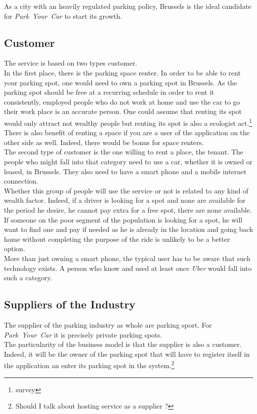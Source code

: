 \documentclass[12pt,a4paper,oneside]{book}
\newcommand{\bp}{\textit{Park~Your~Car }}
\begin{document}
As a city with an heavily regulated parking policy, Brussels is the ideal candidate for \bp to start its growth.

\subsection{Customer}
The service is based on two types customer.\\

In the first place, there is the parking space renter. In order to be able to rent your parking spot, one would need to own a parking spot in Brussels. As the parking spot should be free at a recurring schedule in order to rent it consistently, employed people who do not work at home and use the car to go their work place is an accurate person. One could assume that renting its spot would only attract not wealthy people but renting its spot is also a ecologist act.\footnote{survey} There is also benefit of renting a space if you are a user of the application on the other side as well. Indeed, there would be bonus for space renters.\\

The second type of customer is the one willing to rent a place, the tenant. The people who might fall into that category need to use a car, whether it is owned or leased, in Brussels. They also need to have a smart phone and a mobile internet connection.\\
Whether this group of people will use the service or not is related to any kind of wealth factor. Indeed, if a driver is looking for a spot and none are available for the period he desire, he cannot pay extra for a free spot, there are none available. If someone on the poor segment of the population is looking for a spot, he will want to find one and pay if needed as he is already in the location and going back home without completing the purpose of the ride is unlikely to be a better option.\\
More than just owning a smart phone, the typical user has to be aware that such technology exists. A person who know and used at least once \textit{Uber} would fall into such a category.

\subsection{Suppliers of the Industry}
The supplier of the parking industry as whole are parking sport. For \bp it is precisely private parking spots.\\
The particularity of the business model is that the supplier is also a customer. Indeed, it will be the owner of the parking spot that will have to register itself in the application an enter its parking spot in the system.\footnote{Should I talk about hosting service as a supplier ?}
\end{document}
